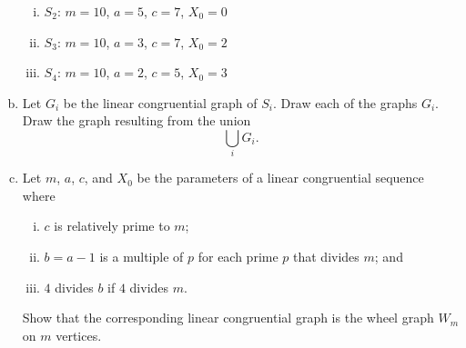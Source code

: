\begin{problem}
\begin{enumerate}[(a)]
\begin{enumerate}[(i)]
    \item $S_2$: $m = 10$, $a = 5$, $c = 7$, $X_0 = 0$

    \item $S_3$: $m = 10$, $a = 3$, $c = 7$, $X_0 = 2$

    \item $S_4$: $m = 10$, $a = 2$, $c = 5$, $X_0 = 3$
    \end{enumerate}

  \item Let $G_i$ be the linear congruential graph of $S_i$. Draw each
    of the graphs $G_i$. Draw the graph resulting from the union
    \[
    \bigcup_i G_i.
    \]

  \item Let $m$, $a$, $c$, and $X_0$ be the parameters of a linear
    congruential sequence where
    \begin{enumerate}[(i)]
    \item $c$ is relatively prime to $m$;

    \item $b = a - 1$ is a multiple of $p$ for each prime $p$ that
      divides $m$; and

    \item $4$ divides $b$ if $4$ divides $m$.
    \end{enumerate}
    Show that the corresponding linear congruential graph is the wheel
    graph $W_m$ on $m$ vertices.
  \end{enumerate}
\end{problem}

